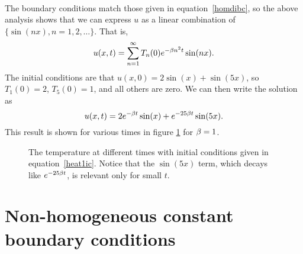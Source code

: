 \documentclass[10pt,driverfallback=hypertex]{report}
\newcounter{small}
\begin{document}
\\
{
  The boundary conditions match those given in equation~\eqref{homdibc}, so
  the above analysis shows that we can express $u$ as a linear combination
  of $\{\sin(nx),n=1,2,\dots\}$. That is,
  \begin{dmath*}
    u(x,t)=\sum_{n=1}^\infty T_n(0) e^{-\b n^2 t} \sin(nx).
  \end{dmath*}
  The initial conditions are that $u(x,0)=2\sin(x)+\sin(5x)$, so $T_1(0)=2$,
  $T_5(0)=1$, and all others are zero. We can then write the solution as
  \begin{dmath*}
    u(x,t) = 2 e^{-\b t} \sin(x) + e^{-25 \b t} \sin(5x).
  \end{dmath*}
 This result is shown for various times in figure \ref{heat1} for $\beta=1$.
  \begin{figure}[htbp]
    \begin{center}
      \caption{The temperature at different times with initial
        conditions given in equation~\eqref{heat1ic}. Notice that the
        $\sin(5x)$ term, which decays like $e^{-25 \beta t}$, is relevant
        only for small $t$. }
      \label{heat1}
    \end{center}
  \end{figure}
}


\section{Non-homogeneous constant boundary conditions}
\end{document}
